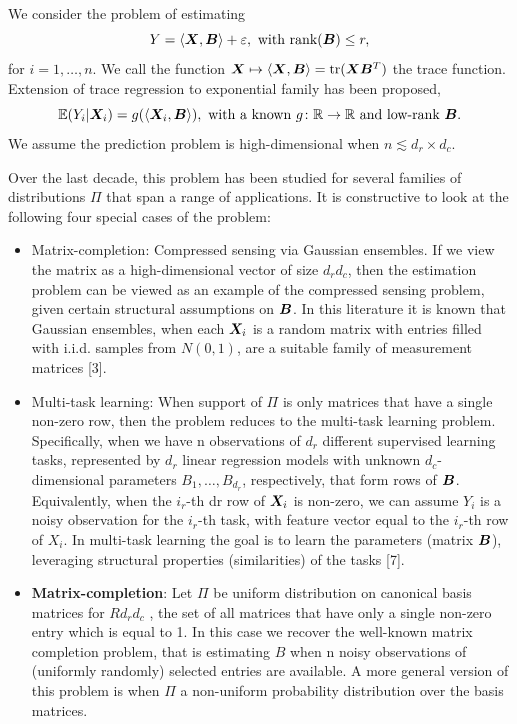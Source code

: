 \documentclass[11pt]{article}
\theoremstyle{plain}
\theoremstyle{definition}
\begin{document}
{\color{red}We consider the problem of estimating
\[
Y=\langle \mX, \mB \rangle+ \varepsilon,\ \text{with }\text{rank}(\mB)\leq r,
\]
for $i=1,\ldots,n$. We call the function $\bm X\mapsto \langle \bm X,\bm B\rangle=\text{tr}(\bm X\bm B^T)$ the trace function. Extension of trace regression to exponential family has been proposed, 
\[
\mathbb{E}(Y_i|\bm X_i)=g(\langle \bm X_i, \bm B \rangle), \ \text{with a known $g\colon \mathbb{R}\to\mathbb{R}$ and low-rank $\bm B$.}
\]
We assume the prediction problem is high-dimensional when $n\lesssim d_r\times d_c$. 

Over the last decade, this problem has been studied for several families of distributions $\Pi$ that span a range of applications. It is constructive to look at the following four special cases of the problem:
\begin{itemize}
\item {Matrix-completion:} Compressed sensing via Gaussian ensembles.
If we view the matrix as a high-dimensional vector of size $d_rd_c$, then the estimation problem can be viewed as an example of the compressed sensing problem, given certain structural assumptions on $\bm B$. In this literature it is known that Gaussian ensembles, when each $\bm X_i$ is a random matrix with entries filled with i.i.d. samples from $N(0, 1)$, are a suitable family of measurement matrices [3].
\item {Multi-task learning}: When support of $\Pi$ is only matrices that have a single non-zero row, then the problem reduces to the multi-task learning problem. Specifically, when we have n observations of $d_r$ different supervised learning tasks, represented by $d_r$ linear regression models with unknown $d_c$-dimensional parameters $B_1,\ldots,B_{d_r}$, respectively, that form rows of $\bm B$. Equivalently, when the $i_r$-th dr
row of $\bm X_i$ is non-zero, we can assume $Y_i$ is a noisy observation for the $i_r$-th task, with feature vector equal to the $i_r$-th row of $X_i$. In multi-task learning the goal is to learn the parameters (matrix $\bm B$), leveraging structural properties (similarities) of the tasks [7].
\item {\bf Matrix-completion}: Let $\Pi$ be uniform distribution on canonical basis matrices for $Rd_r d_c$ , the set of all matrices that have only a single non-zero entry which is equal to 1. In this case we recover the well-known matrix completion problem, that is estimating $B$ when n noisy observations of (uniformly randomly) selected entries are available. A more general version of this problem is when $\Pi$ a non-uniform probability distribution over the basis matrices.


\end{itemize}}
\end{document}
